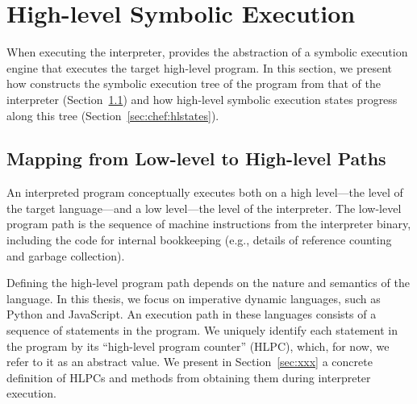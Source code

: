 
\section{High-level Symbolic Execution}


When executing the interpreter, \chef provides the abstraction of a symbolic execution engine that executes the target high-level program.
%
In this section, we present how \chef constructs the symbolic execution tree of the program from that of the interpreter (Section~\ref{sec:chef:ll2hl}) and how high-level symbolic execution states progress along this tree (Section~\ref{sec:chef:hlstates}).

\subsection{Mapping from Low-level to High-level Paths}
\label{sec:chef:ll2hl}


An interpreted program conceptually executes both on a high level---the level of the target language---and a low level---the level of the interpreter.
%
The low-level program path is the sequence of machine instructions from the interpreter binary, including the code for internal bookkeeping (e.g., details of reference counting and garbage collection).



Defining the high-level program path depends on the nature and semantics of the language.  In this thesis, we focus on imperative dynamic languages, such as Python and JavaScript.  An execution path in these languages consists of a sequence of statements in the program.  We uniquely identify each statement in the program by its ``high-level program counter'' (HLPC), which, for now, we refer to it as an abstract value.
%
We present in Section~\ref{sec:xxx} a concrete definition of HLPCs and methods from obtaining them during interpreter execution.

